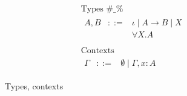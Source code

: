 \begin{figure}
\[
\begin{array}{l}
\mbox{Types \#\_\%} \\
\begin{array}{rcl}
A,B & ::= & \iota \mid A\to B \mid X \\
 & & \forall X.A
\end{array} \\
{} \\
\mbox{Contexts} \\
\begin{array}{rcl}
\Gamma & ::= & \emptyset \mid \Gamma,x:A
\end{array}
\end{array}
\]
\caption{Types, contexts}
\end{figure}

